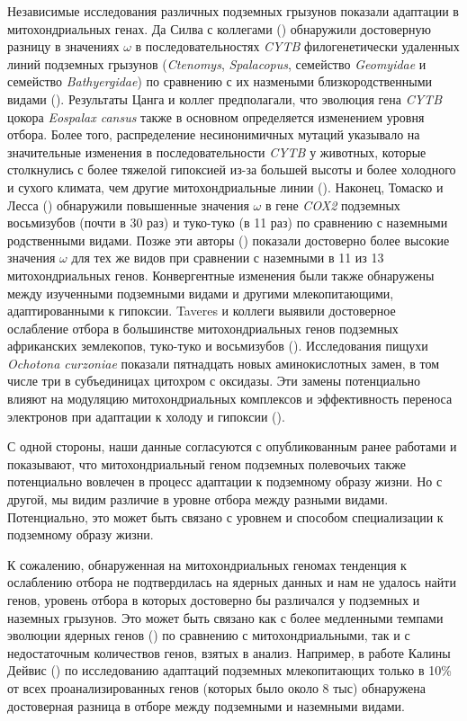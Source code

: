 Независимые исследования различных подземных грызунов показали адаптации в митохондриальных генах. Да Силва с коллегами (\cite{DaSilva2009}) обнаружили достоверную разницу в значениях $\omega$ в последовательностях \textit{CYTB} филогенетически удаленных линий подземных грызунов (\textit{Ctenomys}, \textit{Spalacopus}, семейство \textit{Geomyidae} и семейство \textit{Bathyergidae}) по сравнению с их назмеными близкородственными видами (\cite{Tomasco2014}). Результаты Цанга и коллег предполагали, что эволюция гена \textit{CYTB} цокора \textit{Eospalax cansus} также в основном определяется изменением уровня отбора. Более того, распределение несинонимичных мутаций указывало на значительные изменения в последовательности \textit{CYTB} у животных, которые столкнулись с более тяжелой гипоксией из-за большей высоты и более холодного и сухого климата, чем другие митохондриальные линии (\cite{Zhang2013a}). Наконец, Томаско и Лесса (\cite{Tomasco2011}) обнаружили повышенные значения $\omega$ в гене \textit{COX2} подземных восьмизубов (почти в 30 раз) и туко-туко (в 11 раз) по сравнению с наземными родственными видами. Позже эти авторы (\cite{Tomasco2011}) показали достоверно более высокие значения $\omega$ для тех же видов при сравнении с наземными в 11 из 13 митохондриальных генов. Конвергентные изменения были также обнаружены между изученными подземными видами и другими млекопитающими, адаптированными к гипоксии. Taveres и коллеги выявили достоверное ослабление отбора в большинстве митохондриальных генов подземных африканских землекопов, туко-туко и восьмизубов (\cite{Tavares2018}). Исследования пищухи \textit{Ochotona curzoniae} показали пятнадцать новых аминокислотных замен, в том числе три в субъединицах цитохром с оксидазы. Эти замены потенциально влияют на модуляцию митохондриальных комплексов и эффективность переноса электронов при адаптации к холоду и гипоксии (\cite{Luo2008}).

 
С одной стороны, наши данные согласуются с опубликованным ранее работами и показывают, что митохондриальный геном подземных полевочьих также потенциально вовлечен в процесс адаптации к подземному образу жизни. Но с другой, мы видим различие в уровне отбора между разными видами. Потенциально, это может быть связано с уровнем и способом специализации к подземному образу жизни.

 
К сожалению, обнаруженная на митохондриальных геномах тенденция к ослаблению отбора не подтвердилась на ядерных данных и нам не удалось найти генов, уровень отбора в которых достоверно бы различался у подземных и наземных грызунов. Это может быть связано как с более медленными темпами эволюции ядерных генов (\cite{Lin2004}) по сравнению с митохондриальными, так и с недостаточным количествов генов, взятых в анализ. Например, в работе Калины Дейвис (\cite{Davies2018}) по исследованию адаптаций подземных млекопитающих только в 10\% от всех проанализированных генов (которых было около 8 тыс) обнаружена достоверная разница в отборе между подземными и наземными видами.    


